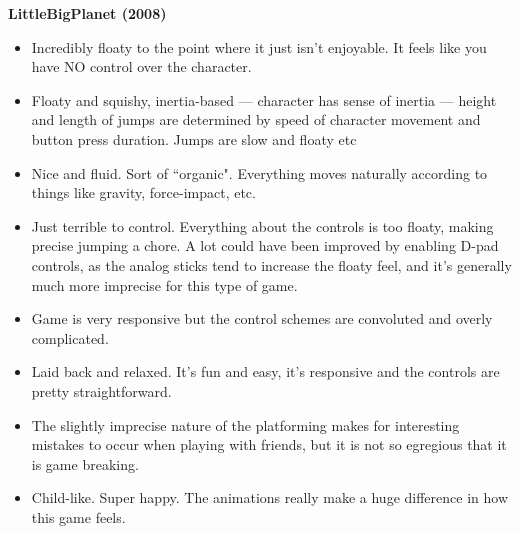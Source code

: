 \textbf{LittleBigPlanet (2008)}
\vspace{-5mm}
\begin{itemize}[noitemsep,nolistsep]
\item Incredibly floaty to the point where it just isn't enjoyable. It feels like you have NO control over the character.
\item Floaty and squishy, inertia-based --- character has sense of inertia --- height and length of jumps are determined by speed of character movement and button press duration. Jumps are slow and floaty etc
\item Nice and fluid. Sort of ``organic". Everything moves naturally according to things like gravity, force-impact, etc.
\item Just terrible to control. Everything about the controls is too floaty, making precise jumping a chore. A lot could have been improved by enabling D-pad controls, as the analog sticks tend to increase the floaty feel, and it's generally much more imprecise for this type of game.
\item Game is very responsive but the control schemes are convoluted and overly complicated. 
\item Laid back and relaxed. It's fun and easy, it's responsive and the controls are pretty straightforward.
\item The slightly imprecise nature of the platforming makes for interesting mistakes to occur when playing with friends, but it is not so egregious that it is game breaking. 
\item Child-like. Super happy. The animations really make a huge difference in how this game feels.
\end{itemize}

